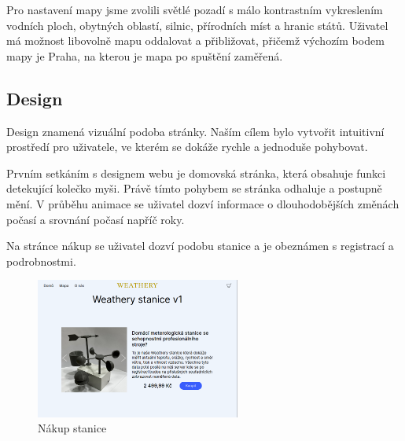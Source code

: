 Pro nastavení mapy jsme zvolili světlé pozadí s málo kontrastním vykreslením vodních ploch, obytných oblastí, silnic, přírodních míst a hranic států. Uživatel má možnost libovolně mapu oddalovat a přibližovat, přičemž výchozím bodem mapy je Praha, na kterou je mapa po spuštění zaměřená.

\subsection{Design}
Design znamená vizuální podoba stránky.
Naším cílem bylo vytvořit intuitivní prostředí pro uživatele, ve kterém se dokáže rychle a jednoduše pohybovat.

Prvním setkáním s designem webu je domovská stránka, která obsahuje funkci detekující kolečko myši.
Právě tímto pohybem se stránka odhaluje a postupně mění. V průběhu animace se uživatel dozví informace o dlouhodobějších změnách počasí a srovnání počasí napříč roky.

Na stránce nákup se uživatel dozví podobu stanice a je obeznámen s registrací a podrobnostmi.
\newpage
\begin{figure}[h] %
    \centering
    \includegraphics[width=0.6\textwidth]{images/nakup.png}
    \caption{Nákup stanice}
    \label{nakup}
\end{figure}
